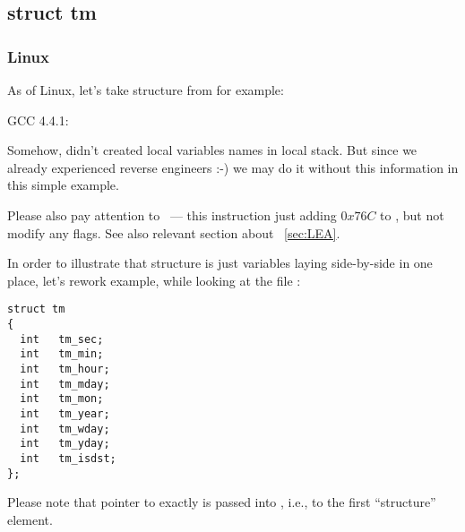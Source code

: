 \subsection{struct tm}

\subsubsection{Linux}

{As of Linux, let's take  structure from  for example:}



 GCC 4.4.1:

\IFRU{}{}

{Somehow, \IDA didn't created local variables names in local stack.
But since we already experienced reverse engineers :-) we may do it without this information in 
this simple example.}

{Please also pay attention to  ~--- this instruction just adding $0x76C$ to \EAX,
but not modify any flags. See also relevant section about \LEA{}~\ref{sec:LEA}.}

{In order to illustrate that structure is just variables laying side-by-side in one place, let's rework
example, while looking at the file} :

\begin{lstlisting}[caption=time.h]
struct tm
{
  int	tm_sec;
  int	tm_min;
  int	tm_hour;
  int	tm_mday;
  int	tm_mon;
  int	tm_year;
  int	tm_wday;
  int	tm_yday;
  int	tm_isdst;
};
\end{lstlisting}



{Please note that pointer to exactly  is passed into , i.e., 
to the first ``structure'' element.}

